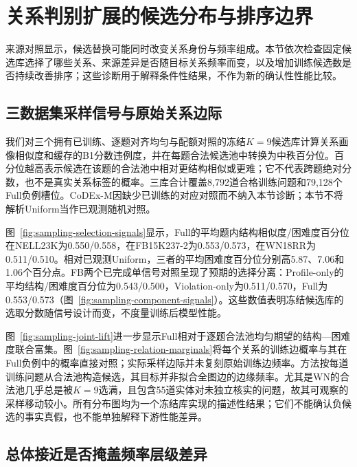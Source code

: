 \section{关系判别扩展的候选分布与排序边界}
\label{sec:analysis}

来源对照显示，候选替换可能同时改变关系身份与频率组成。本节依次检查固定候选库选择了哪些关系、来源差异是否随目标关系频率而变，以及增加训练候选数是否持续改善排序；这些诊断用于解释条件性结果，不作为新的确认性性能比较。

\subsection{三数据集采样信号与原始关系边际}
\label{sec:sampling-signals}

我们对三个拥有已训练、逐题对齐均匀与配额对照的冻结$K=9$候选库计算关系画像相似度和缓存的B1分数违例度，并在每题合法候选池中转换为中秩百分位。百分位越高表示候选在该题的合法池中相对更结构相似或更难；它不代表跨题绝对分数，也不是真实关系标签的概率。三库合计覆盖8,792道合格训练问题和79,128个Full负例槽位。CoDEx-M因缺少已训练的对应对照而不纳入本节诊断；本节不将解析Uniform当作已观测随机对照。

图~\ref{fig:sampling-selection-signals}显示，Full的平均题内结构相似度/困难度百分位在NELL23K为0.550/0.558，在FB15K237-2为0.553/0.573，在WN18RR为0.511/0.510。相对已观测Uniform，三者的平均困难度百分位分别高5.87、7.06和1.06个百分点。FB两个已完成单信号对照呈现了预期的选择分离：Profile-only的平均结构/困难度百分位为0.543/0.500，Violation-only为0.511/0.570，Full为0.553/0.573（图~\ref{fig:sampling-component-signals}）。这些数值表明冻结候选库的选取分数随信号设计而变，不度量训练后模型性能。

图~\ref{fig:sampling-joint-lift}进一步显示Full相对于逐题合法池均匀期望的结构—困难度联合富集。图~\ref{fig:sampling-relation-marginals}将每个关系的训练边概率与其在Full负例中的概率直接对照；实际采样边际并未复刻原始训练边频率。方法按每道训练问题从合法池构造候选，其目标并非拟合全图边的边缘频率。尤其是WN的合法池几乎总是被$K=9$选满，且包含55道实体对未独立核实的问题，故其可观察的采样移动较小。所有分布图均为一个冻结库实现的描述性结果；它们不能确认负候选的事实真假，也不能单独解释下游性能差异。



\subsection{总体接近是否掩盖频率层级差异}
\label{sec:frequency-slices}

